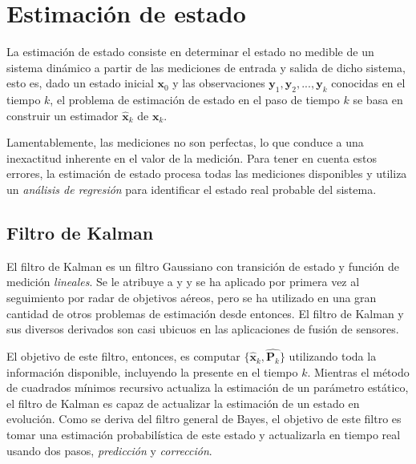 \section{Estimación de estado}
\label{sec:stateestimation}
La estimación de estado consiste en determinar el estado no medible de un sistema dinámico a partir de las mediciones de entrada y salida de dicho sistema, esto es, dado un estado inicial $\bm{x}_0$ y las observaciones $\bm{y}_1, \bm{y}_2, ..., \bm{y}_k$ conocidas en el tiempo $k$, el problema de estimación de estado en el paso de tiempo $k$ se basa en construir un estimador $\hat{\bm{x}}_k$ de $\bm{x}_k$.

Lamentablemente, las mediciones no son perfectas, lo que conduce a una inexactitud inherente en el valor de la medición. Para tener en cuenta estos errores, la estimación de estado procesa todas las mediciones disponibles y utiliza un \textit{análisis de regresión} para identificar el estado real probable del sistema.

\subsection{Filtro de Kalman}
El filtro de Kalman es un filtro Gaussiano con transición de estado y función de medición \textit{lineales}. Se le atribuye a \cite{kalman1960} y \cite{swerling1958} y se ha aplicado por primera vez al seguimiento por radar de objetivos aéreos, pero se ha utilizado en una gran cantidad de otros problemas de estimación desde entonces. El filtro de Kalman y sus diversos derivados son casi ubicuos en las aplicaciones de fusión de sensores.

El objetivo de este filtro, entonces, es computar $\{\hat{\bm{x}}_k,\hat{\bm{P}_k}\}$ utilizando toda la información disponible, incluyendo la presente en el tiempo $k$. Mientras el método de cuadrados mínimos recursivo actualiza la estimación de un parámetro estático, el filtro de Kalman es capaz de actualizar la estimación de un estado en evolución. Como se deriva del filtro general de Bayes\cite{barfoot2020}\cite{sarkka2013}, el objetivo de este filtro es tomar una estimación probabilística de este estado y actualizarla en tiempo real usando dos pasos, \textit{predicción} y \textit{corrección}.

